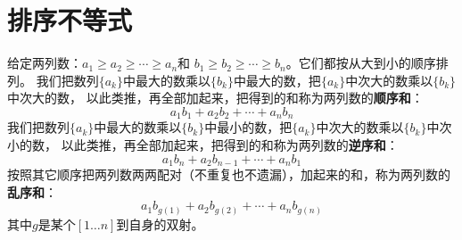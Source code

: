 \documentclass[12pt,UTF8]{ctexbook}
\begin{document}
\section{排序不等式}

给定两列数：$a_1 \geqslant a_2 \geqslant \cdots \geqslant a_n$和
$b_1 \geqslant b_2 \geqslant \cdots \geqslant b_n$。它们都按从大到小的顺序排列。
我们把数列$\{a_k\}$中最大的数乘以$\{b_k\}$中最大的数，把$\{a_k\}$中次大的数乘以$\{b_k\}$中次大的数，
以此类推，再全部加起来，把得到的和称为两列数的\textbf{顺序和}：
$$ a_1b_1 + a_2b_2 + \cdots + a_nb_n $$
我们把数列$\{a_k\}$中最大的数乘以$\{b_k\}$中最小的数，把$\{a_k\}$中次大的数乘以$\{b_k\}$中次小的数，
以此类推，再全部加起来，把得到的和称为两列数的\textbf{逆序和}：
$$ a_1b_n + a_2b_{n-1} + \cdots + a_nb_1 $$
按照其它顺序把两列数两两配对（不重复也不遗漏），加起来的和，称为两列数的\textbf{乱序和}：
$$ a_1b_{g(1)} + a_2b_{g(2)} + \cdots + a_nb_{g(n)} $$
其中$g$是某个$[1\dots n]$到自身的双射。
\end{document}
